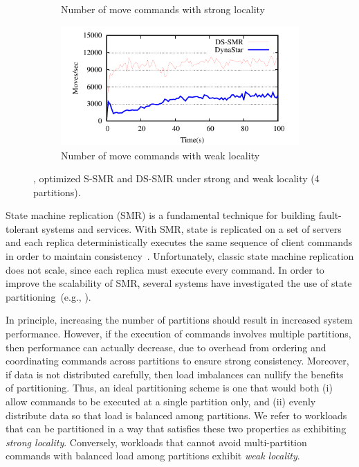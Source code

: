 \begin{figure}[ht!]
\begin{subfigure}[b]{0.45\textwidth}
  \caption{Number of move commands with strong locality}
  \end{subfigure}
  \begin{subfigure}[b]{0.45\textwidth}
    \centering
    \includegraphics[width=0.95\columnwidth]{figures/socc/socc-moves-weak-locality}
    \caption{Number of move commands with weak locality}
  \end{subfigure}
  \caption{\dynastar, optimized S-SMR and DS-SMR under strong and weak locality (4 partitions).}
  \label{fig:motivation}
\end{figure}




State machine replication (SMR) is a fundamental technique for
building fault-tolerant systems and services. With SMR, state is
replicated on a set of servers and each replica deterministically
executes the same sequence of client commands in order to maintain
consistency~\cite{Lam78,Sch90}. Unfortunately, classic state machine replication does not
scale, since each replica must execute every command. In order to
improve the scalability of SMR, several systems have investigated the
use of state partitioning~(e.g., \cite{Aguilera:2007, bezerra2014ssmr,corbett2013spanner,Glendenning:2011kj,
  bli16edcc}).

In principle, increasing the number of partitions should result in
increased system performance. However, if the execution of commands involves
multiple partitions, then performance can
actually decrease, due to overhead from ordering and coordinating
commands across partitions to ensure strong consistency. Moreover, if
data is not distributed carefully, then load imbalances can nullify
the benefits of partitioning. Thus, an ideal partitioning scheme is
one that would both (i) allow commands to be executed at a single
partition only, and (ii) evenly distribute data so that load is
balanced among partitions.  We refer to workloads that can be
partitioned in a way that satisfies these two properties as exhibiting
\emph{strong locality}.
Conversely, workloads that cannot avoid multi-partition commands with balanced load among partitions exhibit \emph{weak locality}.

